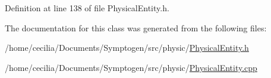 Definition at line 138 of file Physical\-Entity.\-h.



The documentation for this class was generated from the following files\-:\begin{DoxyCompactItemize}
\item 
/home/cecilia/\-Documents/\-Symptogen/src/physic/\hyperlink{_physical_entity_8h}{Physical\-Entity.\-h}\item 
/home/cecilia/\-Documents/\-Symptogen/src/physic/\hyperlink{_physical_entity_8cpp}{Physical\-Entity.\-cpp}\end{DoxyCompactItemize}
